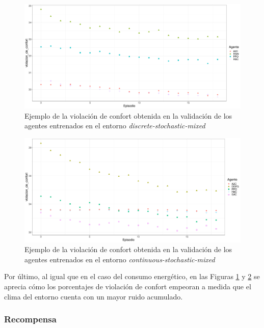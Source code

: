 \begin{figure}
    \centering
    \includegraphics[width=\textwidth]{imagenes/confort-disc-mixed.pdf}
    \caption{Ejemplo de la violación de confort obtenida en la validación de los agentes entrenados en el entorno \textit{discrete-stochastic-mixed}}
    \label{fig:confort-disc-mixed}
\end{figure}

\begin{figure}
    \centering
    \includegraphics[width=\textwidth]{imagenes/confort-cont-mixed.pdf}
    \caption{Ejemplo de la violación de confort obtenida en la validación de los agentes entrenados en el entorno \textit{continuous-stochastic-mixed}}
    \label{fig:confort-cont-mixed}
\end{figure}

Por último, al igual que en el caso del consumo energético, en las Figuras \ref{fig:confort-disc-mixed} y \ref{fig:confort-cont-mixed} se aprecia cómo los porcentajes de violación de confort empeoran a medida que el clima del entorno cuenta con un mayor ruido acumulado.

\subsubsection{Recompensa}

